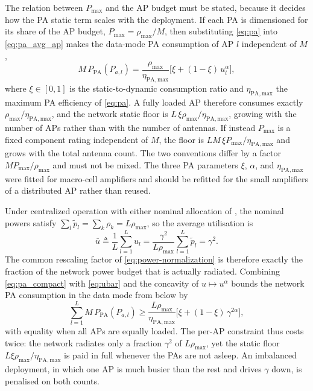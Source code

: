 \begin{remark}
\label{rem:pa_sizing}
The relation between $P_{\max}$ and the AP budget must be stated, because it
decides how the PA static term scales with the deployment. If each PA is
dimensioned for its share of the AP budget, $P_{\max}=\rho_{\max}/M$, then
substituting \eqref{eq:pa} into \eqref{eq:pa_avg_ap} makes the data-mode PA
consumption of AP $l$ independent of $M$,
\begin{equation}
\label{eq:pa_compact}
M\,P_{\mathrm{PA}}(P_{a,l}) =
\frac{\rho_{\max}}{\eta_{\mathrm{PA,max}}}
\Big[\xi + (1-\xi)\,u_{l}^{\alpha}\Big],
\end{equation}
where $\xi\in[0,1]$ is the static-to-dynamic consumption ratio and
$\eta_{\mathrm{PA,max}}$ the maximum PA efficiency of \eqref{eq:pa}. A fully
loaded AP therefore consumes exactly $\rho_{\max}/\eta_{\mathrm{PA,max}}$, and
the network static floor is $L\,\xi\rho_{\max}/\eta_{\mathrm{PA,max}}$, growing
with the number of APs rather than with the number of antennas. If instead
$P_{\max}$ is a fixed component rating independent of $M$, the floor is
$LM\,\xi P_{\max}/\eta_{\mathrm{PA,max}}$ and grows with the total antenna count.
The two conventions differ by a factor $M P_{\max}/\rho_{\max}$ and must not be
mixed. The three PA parameters $\xi$, $\alpha$, and $\eta_{\mathrm{PA,max}}$
were fitted for macro-cell amplifiers and should be refitted for the small
amplifiers of a distributed AP rather than reused.
\end{remark}

\begin{remark}
\label{rem:gamma}
Under centralized operation with either nominal allocation of
, the nominal powers satisfy $\sum_{l}\tilde
p_{l}=\sum_{k}\rho_{k}=L\rho_{\max}$, so the average utilisation is
\begin{equation}
\label{eq:ubar}
\bar u \triangleq \frac{1}{L}\sum_{l=1}^{L} u_{l}
= \frac{\gamma^{2}}{L\rho_{\max}}\sum_{l=1}^{L}\tilde p_{l}
= \gamma^{2}.
\end{equation}
The common rescaling factor of \eqref{eq:power-normalization} is therefore
exactly the fraction of the network power budget that is actually radiated.
Combining \eqref{eq:pa_compact} with \eqref{eq:ubar} and the concavity of
$u\mapsto u^{\alpha}$ bounds the network PA consumption in the data mode from
below by
\begin{equation}
\label{eq:pa_network_bound}
\sum_{l=1}^{L} M\,P_{\mathrm{PA}}(P_{a,l}) \geq
\frac{L\rho_{\max}}{\eta_{\mathrm{PA,max}}}
\Big[\xi + (1-\xi)\,\gamma^{2\alpha}\Big],
\end{equation}
with equality when all APs are equally loaded. The per-AP constraint thus costs
twice: the network radiates only a fraction $\gamma^{2}$ of $L\rho_{\max}$, yet
the static floor $L\xi\rho_{\max}/\eta_{\mathrm{PA,max}}$ is paid in full
whenever the PAs are not asleep. An imbalanced deployment, in which one AP is
much busier than the rest and drives $\gamma$ down, is penalised on both counts.
\end{remark}

